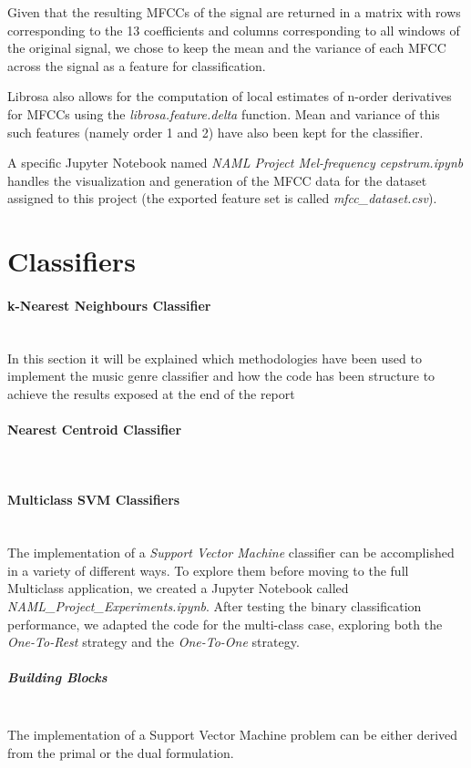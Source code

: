 \documentclass[12pt]{article}
\begin{document}
	Given that the resulting MFCCs of the signal are returned in a matrix with rows corresponding to the 13 coefficients and columns corresponding to all windows of the original signal, we chose to keep the mean and the variance of each MFCC across the signal as a feature for classification.
	
	Librosa also allows for the computation of local estimates of n-order derivatives for MFCCs using the \textit{librosa.feature.delta} function. Mean and variance of this such features (namely order 1 and 2) have also been kept for the classifier.
	
	A specific Jupyter Notebook named \textit{NAML Project Mel-frequency cepstrum.ipynb} handles the visualization and generation of the MFCC data for the dataset assigned to this project (the exported feature set is called \textit{mfcc\_dataset.csv}).
	
	\newpage
	
	\section{Classifiers}
	\paragraph{k-Nearest Neighbours Classifier}\mbox{}\\\newline
	In this section it will be explained which methodologies have been used to implement the music genre classifier and how the code has been structure to achieve the results exposed at the end of the report 
	\paragraph{Nearest Centroid Classifier}\mbox{}\\\newline
	\paragraph{Multiclass SVM Classifiers}\mbox{}\\\newline
	The implementation of a \textit{Support Vector Machine} classifier can be accomplished in a variety of different ways. To explore them before moving to the full Multiclass application, we created a Jupyter Notebook called \textit{NAML\_Project\_Experiments.ipynb}. After testing the binary classification performance, we adapted the code for the multi-class case, exploring both the \textit{One-To-Rest} strategy and the \textit{One-To-One} strategy.
	\subparagraph{Building Blocks}\mbox{}\\\newline
	The implementation of a Support Vector Machine problem can be either derived from the primal or the dual formulation.
	
\end{document}
